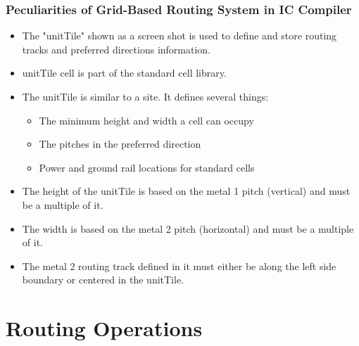 \documentclass[compress]{beamer}
\begin{document}
	\begin{frame}
		\frametitle{Peculiarities of Grid-Based Routing System in IC Compiler}
		\begin{itemize}
		\item The "unitTile" shown as a screen shot is used to define and store routing tracks and preferred directions information. 
		\item unitTile cell is part of the standard cell library.
		\item The unitTile is similar to a site. It defines several things:
		\begin{itemize}
			\item The minimum height and width a cell can occupy
			\item The pitches in the preferred direction
			\item Power and ground rail locations for standard cells
			
		\end{itemize}
		\item The height of the unitTile is based on the metal 1 pitch (vertical) and must be a multiple of it. 
		\item The width is based on the metal 2 pitch (horizontal) and must be a multiple of it.
	\item The metal 2 routing track defined in it must either be along the left side boundary or centered in the unitTile. 
		
		\end{itemize}
	\end{frame}
\section[Routing]{Routing Operations}
\end{document}
